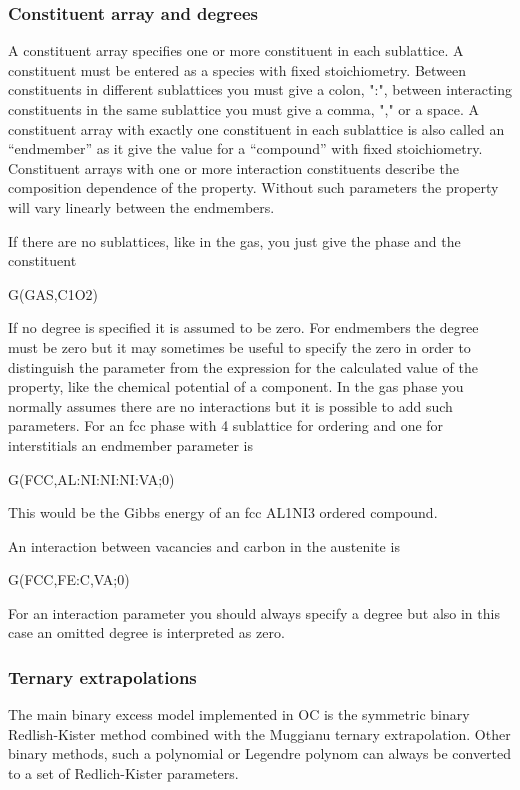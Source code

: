 \documentclass[11pt]{article}
\begin{document}
\subsubsection{Constituent array and degrees}

A constituent array specifies one or more constituent in each
sublattice.  A constituent must be entered as a species with fixed
stoichiometry.  Between constituents in different sublattices you must
give a colon, ":", between interacting constituents in the same
sublattice you must give a comma, "," or a space.  A constituent array
with exactly one constituent in each sublattice is also called an
``endmember'' as it give the value for a ``compound'' with fixed
stoichiometry.  Constituent arrays with one or more interaction
constituents describe the composition dependence of the property.
Without such parameters the property will vary linearly between the
endmembers.

If there are no sublattices, like in the gas, you just give the phase
and the constituent

G(GAS,C1O2)

If no degree is specified it is assumed to be zero.  For endmembers
the degree must be zero but it may sometimes be useful to specify the
zero in order to distinguish the parameter from the expression for the
calculated value of the property, like the chemical potential of a
component.  In the gas phase you normally assumes there are no
interactions but it is possible to add such parameters.  For an fcc
phase with 4 sublattice for ordering and one for interstitials an
endmember parameter is

G(FCC,AL:NI:NI:NI:VA;0)

This would be the Gibbs energy of an fcc AL1NI3 ordered compound.

An interaction between vacancies and carbon in the austenite is

G(FCC,FE:C,VA;0)

For an interaction parameter you should always specify a degree but
also in this case an omitted degree is interpreted as zero.

\subsubsection{Ternary extrapolations}\label{sc:excessparameters}

The main binary excess model implemented in OC is the symmetric binary
Redlish-Kister method combined with the Muggianu ternary
extrapolation.  Other binary methods, such a polynomial or Legendre
polynom can always be converted to a set of Redlich-Kister parameters.
\end{document}

